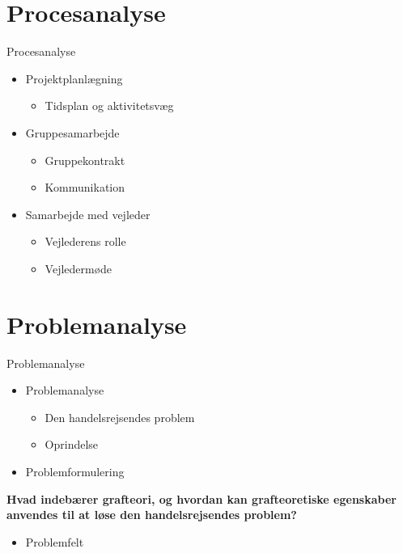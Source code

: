 \section{Procesanalyse}
\begin{frame}{Procesanalyse}

\begin{itemize}
\item Projektplanlægning
\begin{itemize}
\item Tidsplan og aktivitetsvæg
\end{itemize}
\item Gruppesamarbejde
	\begin{itemize}
	\item Gruppekontrakt
	\item Kommunikation 
	\end{itemize}
\item Samarbejde med vejleder 
	\begin{itemize}
	\item Vejlederens rolle
	\item Vejledermøde
	\end{itemize}
\end{itemize}
\end{frame}

\section{Problemanalyse}
\begin{frame}{Problemanalyse}

\begin{itemize}
\item Problemanalyse
\begin{itemize}
\item Den handelsrejsendes problem
\item Oprindelse
\end{itemize}
\item Problemformulering
\end{itemize}
\begin{center}
\textbf{Hvad indebærer grafteori, og hvordan kan grafteoretiske egenskaber anvendes til at løse den handelsrejsendes problem?}
\end{center}
\begin{itemize}
\item Problemfelt
\end{itemize}

\end{frame}